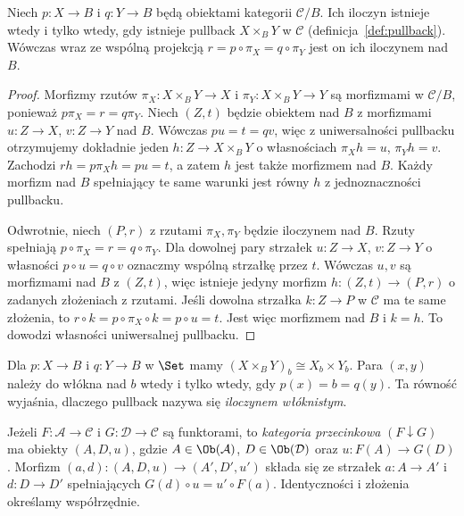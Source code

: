 \begin{stwierdzenie}\label{cat:prop:slice-product}
Niech $p:X\to B$ i $q:Y\to B$ będą obiektami kategorii $\mathcal C/B$. Ich iloczyn istnieje wtedy i tylko wtedy, gdy istnieje pullback $X\times_B Y$ w $\mathcal C$ (definicja~\ref{def:pullback}). Wówczas wraz ze wspólną projekcją $r=p\circ\pi_X=q\circ\pi_Y$ jest on ich iloczynem nad $B$.
\end{stwierdzenie}
\begin{proof}
Morfizmy rzutów $\pi_X:X\times_B Y\to X$ i $\pi_Y:X\times_B Y\to Y$ są morfizmami w $\mathcal C/B$, ponieważ $p\pi_X=r=q\pi_Y$. Niech $(Z,t)$ będzie obiektem nad $B$ z morfizmami $u:Z\to X$, $v:Z\to Y$ nad $B$. Wówczas $pu=t=qv$, więc z uniwersalności pullbacku otrzymujemy dokładnie jeden $h:Z\to X\times_B Y$ o własnościach $\pi_Xh=u$, $\pi_Yh=v$. Zachodzi $rh=p\pi_Xh=pu=t$, a zatem $h$ jest także morfizmem nad $B$. Każdy morfizm nad $B$ spełniający te same warunki jest równy $h$ z jednoznaczności pullbacku.

Odwrotnie, niech $(P,r)$ z rzutami $\pi_X,\pi_Y$ będzie iloczynem nad $B$. Rzuty spełniają $p\circ\pi_X=r=q\circ\pi_Y$. Dla dowolnej pary strzałek $u:Z\to X$, $v:Z\to Y$ o własności $p\circ u=q\circ v$ oznaczmy wspólną strzałkę przez $t$. Wówczas $u,v$ są morfizmami nad $B$ z $(Z,t)$, więc istnieje jedyny morfizm $h:(Z,t)\to(P,r)$ o zadanych złożeniach z rzutami. Jeśli dowolna strzałka $k:Z\to P$ w $\mathcal C$ ma te same złożenia, to $r\circ k=p\circ\pi_X\circ k=p\circ u=t$. Jest więc morfizmem nad $B$ i $k=h$. To dowodzi własności uniwersalnej pullbacku.
\end{proof}

\begin{przyklad}
Dla $p:X\to B$ i $q:Y\to B$ w $\Set$ mamy $(X\times_B Y)_b\cong X_b\times Y_b$. Para $(x,y)$ należy do włókna nad $b$ wtedy i tylko wtedy, gdy $p(x)=b=q(y)$. Ta równość wyjaśnia, dlaczego pullback nazywa się \emph{iloczynem włóknistym}.
\end{przyklad}

\begin{definicja}\label{cat:def:comma}
Jeżeli $F:\mathcal A\to\mathcal C$ i $G:\mathcal D\to\mathcal C$ są funktorami, to \emph{kategoria przecinkowa} $(F\downarrow G)$ ma obiekty $(A,D,u)$, gdzie $A\in\Ob(\mathcal A)$, $D\in\Ob(\mathcal D)$ oraz $u:F(A)\to G(D)$. Morfizm $(a,d):(A,D,u)\to(A',D',u')$ składa się ze strzałek $a:A\to A'$ i $d:D\to D'$ spełniających $G(d)\circ u=u'\circ F(a)$. Identyczności i złożenia określamy współrzędnie.
\end{definicja}


